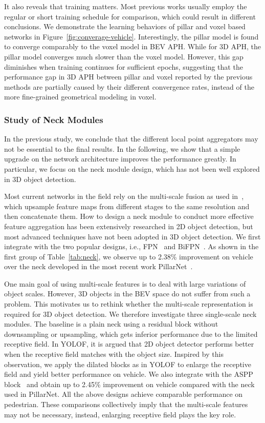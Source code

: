 \documentclass[10pt,twocolumn,letterpaper]{article}
\begin{document}
It also reveals that training matters. Most previous works usually employ the regular or short training schedule for comparison, which could result in different conclusions. We demonstrate the learning behaviors of pillar and voxel based networks in Figure~\ref{fig:converage-vehicle}. Interestingly, the pillar model is found to converge comparably to the voxel model in BEV APH. While for 3D APH, the pillar model converges much slower than the voxel model. However, this gap diminishes when training continues for sufficient epochs, suggesting that the performance gap in 3D APH between pillar and voxel reported by the previous methods are partially caused by their different convergence rates, instead of the more fine-grained geometrical modeling in voxel. 



\subsubsection{Study of Neck Modules}
In the previous study, we conclude that the different local point aggregators may not be essential to the final results. In the following, we show that a simple upgrade on the network architecture improves the performance greatly. In particular, we focus on the neck module design, which has not been well explored in 3D object detection.

Most current networks in the field rely on the multi-scale fusion as used in~\cite{zhou2018voxelnet, shi2022pillarnet}, which upsample feature maps from different stages to the same resolution and then concatenate them. How to design a neck module to conduct more effective feature aggregation has been extensively researched in 2D object detection, but most advanced techniques have not been adopted in 3D object detection. We first integrate with the two popular designs, i.e., FPN~\cite{lin2017feature} and BiFPN~\cite{tan2020efficientdet}. As shown in the first group of Table~\ref{tab:neck}, we observe up to 2.38\% improvement on vehicle over the neck developed in the most recent work PillarNet~\cite{shi2022pillarnet}.
 
One main goal of using multi-scale features is to deal with large variations of object scales. However, 3D objects in the BEV space do not suffer from such a problem. This motivates us to rethink whether the multi-scale representation is required for 3D object detection. We therefore investigate three single-scale neck modules. The baseline is a plain neck using a residual block without downsampling or upsampling, which gets inferior performance due to the limited receptive field. In YOLOF\cite{yolof}, it is argued that 2D object detector performs better when the receptive field matches with the object size. Inspired by this observation, we apply the dilated blocks as in YOLOF to enlarge the receptive field and yield better performance on vehicle. We also integrate with the ASPP block~\cite{Chen_2018_PAMI} and obtain up to 2.45\% improvement on vehicle compared with the neck used in PillarNet. 
All the above designs achieve comparable performance on pedestrian. These comparisons collectively imply that the multi-scale features may not be necessary, instead, enlarging receptive field plays the key role. 
\end{document}
